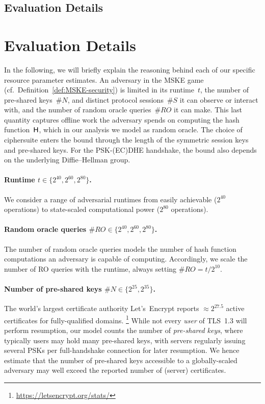 \def\EvalTitle{Evaluation Details}
\iffull
	\subsection{\EvalTitle}
\else
	\newpage
	\section{\EvalTitle}
\fi
\label{app:evaluation}

In the following, we will briefly explain the reasoning behind each of our specific resource parameter estimates. 
An adversary in the MSKE game (cf.\ Definition~\ref{def:MSKE-security}) is limited in its runtime~$t$, the number of pre-shared keys~$\#N$, and distinct protocol sessions~$\#S$ it can observe or interact with, and the number of random oracle queries~$\#RO$ it can make.
This last quantity captures offline work the adversary spends on computing the hash function~$\mathsf{H}$, which in our analysis we model as random oracle.
The choice of ciphersuite enters the bound through the length of the symmetric session keys and pre-shared keys.
For the PSK-(EC)DHE handshake, the bound also depends on the underlying Diffie--Hellman group.


\paragraph{Runtime $t \in \{2^{40}, 2^{60}, 2^{80}\}$.}
We consider a range of adversarial runtimes from easily achievable ($2^{40}$ operations) to state-scaled computational power ($2^{80}$ operations). 

\paragraph{Random oracle queries $\#RO \in \{2^{40}, 2^{60}, 2^{80}\}$.}
The number of random oracle queries models the number of hash function computations an adversary is capable of computing. Accordingly, we scale the number of RO queries with the runtime, always setting $\#RO = t/2^{10}$.

\paragraph{Number of pre-shared keys $\#N \in \{2^{25}, 2^{35}\}$.}
The world's largest certificate authority Let's~Encrypt reports $\approx 2^{27.5}$ active certificates for fully-qualified domains.%
\footnote{\url{https://letsencrypt.org/stats/}} %
While not every \emph{user} of TLS~1.3 will perform resumption, our model counts the number of \emph{pre-shared keys},
where typically users may hold many pre-shared keys, with servers regularly issuing several PSKs per full-handshake connection for later resumption.
We hence estimate that the number of pre-shared keys accessible to a globally-scaled adversary may well exceed the reported number of (server) certificates.

